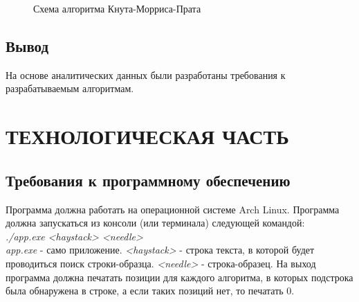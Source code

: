 \documentclass[a4paper,12pt]{article}
\begin{document}
\begin{figure}[H]
\caption{Схема алгоритма Кнута-Морриса-Прата}
\label{images:knutmorrispratt}
\end{figure}

\newpage
\subsection{Вывод}
На основе аналитических данных были разработаны требования к разрабатываемым алгоритмам.


\newpage
\section{ТЕХНОЛОГИЧЕСКАЯ ЧАСТЬ}
\subsection{Требования к программному обеспечению}
Программа должна работать на операционной системе Arch Linux. 
Программа должна запускаться из консоли (или терминала) следующей командой:\\
\textit{./app.exe <haystack> <needle>} \\
\textit{app.exe} - само приложение. \textit{<haystack>} - строка текста, в которой будет проводиться поиск строки-образца. \textit{<needle>} - строка-образец.
На выход программа должна печатать позиции для каждого алгоритма, в которых подстрока была обнаружена в строке, а если таких позиций нет, то печатать 0.
\end{document}

